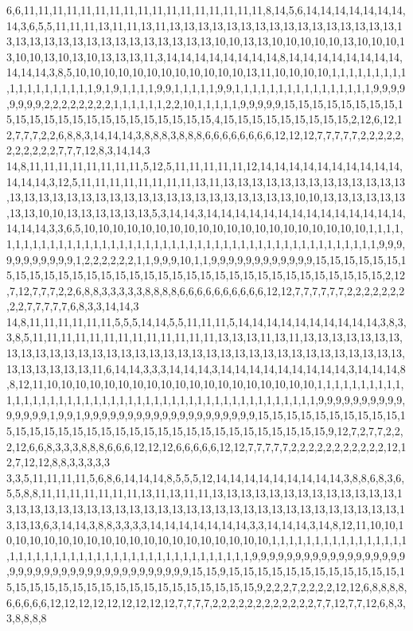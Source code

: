 6,6,11,11,11,11,11,11,11,11,11,11,11,11,11,11,11,11,11,8,14,5,6,14,14,14,14,14,14,14,14,3,6,5,5,11,11,11,13,11,11,13,11,13,13,13,13,13,13,13,13,13,13,13,13,13,13,13,13,13,13,13,13,13,13,13,13,13,13,13,13,13,13,13,10,10,13,13,10,10,10,10,10,13,10,10,10,13,10,10,13,10,13,10,13,13,13,11,3,14,14,14,14,14,14,14,14,8,14,14,14,14,14,14,14,14,14,14,14,3,8,5,10,10,10,10,10,10,10,10,10,10,10,10,13,11,10,10,10,10,1,1,1,1,1,1,1,1,1,1,1,1,1,1,1,1,1,1,1,9,1,9,1,1,1,1,9,9,1,1,1,1,1,9,9,1,1,1,1,1,1,1,1,1,1,1,1,1,1,1,1,9,9,9,9,9,9,9,9,2,2,2,2,2,2,2,2,1,1,1,1,1,1,2,2,10,1,1,1,1,1,9,9,9,9,9,15,15,15,15,15,15,15,15,15,15,15,15,15,15,15,15,15,15,15,15,15,15,15,4,15,15,15,15,15,15,15,15,15,2,12,6,12,12,7,7,7,2,2,6,8,8,3,14,14,14,3,8,8,8,3,8,8,8,6,6,6,6,6,6,6,6,12,12,12,7,7,7,7,7,2,2,2,2,2,2,2,2,2,2,2,7,7,7,12,8,3,14,14,3
14,8,11,11,11,11,11,11,11,11,5,12,5,11,11,11,11,11,12,14,14,14,14,14,14,14,14,14,14,14,14,14,3,12,5,11,11,11,11,11,11,11,11,13,11,13,13,13,13,13,13,13,13,13,13,13,13,13,13,13,13,13,13,13,13,13,13,13,13,13,13,13,13,13,13,13,13,13,10,10,13,13,13,13,13,13,13,13,10,10,13,13,13,13,13,13,5,3,14,14,3,14,14,14,14,14,14,14,14,14,14,14,14,14,14,14,14,14,3,3,6,5,10,10,10,10,10,10,10,10,10,10,10,10,10,10,10,10,10,10,10,10,1,1,1,1,1,1,1,1,1,1,1,1,1,1,1,1,1,1,1,1,1,1,1,1,1,1,1,1,1,1,1,1,1,1,1,1,1,1,1,1,1,1,1,1,1,1,1,9,9,9,9,9,9,9,9,9,9,9,1,2,2,2,2,2,2,1,1,9,9,9,10,1,1,9,9,9,9,9,9,9,9,9,9,9,9,15,15,15,15,15,15,15,15,15,15,15,15,15,15,15,15,15,15,15,15,15,15,15,15,15,15,15,15,15,15,15,15,15,2,12,7,12,7,7,7,2,2,6,8,8,3,3,3,3,3,8,8,8,8,6,6,6,6,6,6,6,6,6,6,12,12,7,7,7,7,7,7,2,2,2,2,2,2,2,2,2,7,7,7,7,7,6,8,3,3,14,14,3
14,8,11,11,11,11,11,11,5,5,5,14,14,5,5,11,11,11,5,14,14,14,14,14,14,14,14,14,14,3,8,3,3,8,5,11,11,11,11,11,11,11,11,11,11,11,11,11,13,13,13,11,13,11,13,13,13,13,13,13,13,13,13,13,13,13,13,13,13,13,13,13,13,13,13,13,13,13,13,13,13,13,13,13,13,13,13,13,13,13,13,13,13,13,13,11,6,14,14,3,3,3,14,14,14,3,14,14,14,14,14,14,14,14,14,3,14,14,14,8,8,12,11,10,10,10,10,10,10,10,10,10,10,10,10,10,10,10,10,10,10,10,1,1,1,1,1,1,1,1,1,1,1,1,1,1,1,1,1,1,1,1,1,1,1,1,1,1,1,1,1,1,1,1,1,1,1,1,1,1,1,1,1,1,1,1,1,1,9,9,9,9,9,9,9,9,9,9,9,9,9,9,9,1,9,9,1,9,9,9,9,9,9,9,9,9,9,9,9,9,9,9,9,9,9,9,9,15,15,15,15,15,15,15,15,15,15,15,15,15,15,15,15,15,15,15,15,15,15,15,15,15,15,15,15,15,15,15,15,15,9,12,7,2,7,7,2,2,2,12,6,6,8,3,3,3,8,8,8,6,6,6,12,12,12,6,6,6,6,6,12,12,7,7,7,7,7,2,2,2,2,2,2,2,2,2,2,2,12,12,7,12,12,8,8,3,3,3,3,3
3,3,5,11,11,11,11,5,6,8,6,14,14,14,8,5,5,5,12,14,14,14,14,14,14,14,14,14,3,8,8,6,8,3,6,5,5,8,8,11,11,11,11,11,11,11,13,11,13,11,11,13,13,13,13,13,13,13,13,13,13,13,13,13,13,13,13,13,13,13,13,13,13,13,13,13,13,13,13,13,13,13,13,13,13,13,13,13,13,13,13,13,13,13,13,6,3,14,14,3,8,8,3,3,3,3,14,14,14,14,14,14,14,3,3,14,14,14,3,14,8,12,11,10,10,10,10,10,10,10,10,10,10,10,10,10,10,10,10,10,10,10,10,10,1,1,1,1,1,1,1,1,1,1,1,1,1,1,1,1,1,1,1,1,1,1,1,1,1,1,1,1,1,1,1,1,1,1,1,1,1,1,1,1,1,1,1,1,9,9,9,9,9,9,9,9,9,9,9,9,9,9,9,9,9,9,9,9,9,9,9,9,9,9,9,9,9,9,9,9,9,9,9,9,9,9,9,15,15,9,15,15,15,15,15,15,15,15,15,15,15,15,15,15,15,15,15,15,15,15,15,15,15,15,15,15,15,15,15,15,9,2,2,2,7,2,2,2,2,12,12,6,8,8,8,8,6,6,6,6,6,12,12,12,12,12,12,12,12,12,7,7,7,7,2,2,2,2,2,2,2,2,2,2,2,2,7,7,12,7,7,12,6,8,3,3,8,8,8,8
